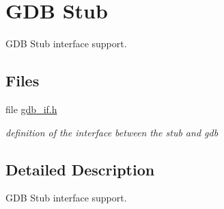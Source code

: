 \hypertarget{group__m68k__gdbstub}{}\section{G\+DB Stub}
\label{group__m68k__gdbstub}


G\+DB Stub interface support.  


\subsection*{Files}
\begin{DoxyCompactItemize}
\item 
file \mbox{\hyperlink{m68k_2shared_2gdbstub_2gdb__if_8h}{gdb\+\_\+if.\+h}}
\begin{DoxyCompactList}\small\item\em definition of the interface between the stub and gdb \end{DoxyCompactList}\end{DoxyCompactItemize}


\subsection{Detailed Description}
G\+DB Stub interface support. 


